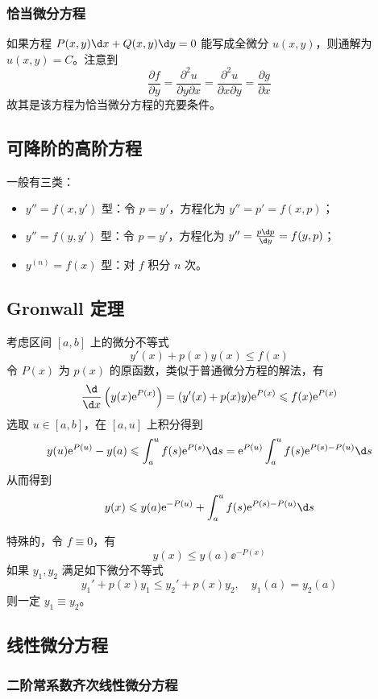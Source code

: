 \subsubsection*{恰当微分方程}

如果方程 $P(x, y) \d x + Q(x, y) \d y = 0$ 能写成全微分 $u(x, y)$，则通解为 $u(x, y) = C$。注意到
\[ \frac{\partial f}{\partial y} = \frac{\partial^2 u}{\partial y \partial x} = \frac{\partial^2 u}{\partial x \partial y} = \frac{\partial g}{\partial x} \]
故其是该方程为恰当微分方程的充要条件。

\subsection{可降阶的高阶方程}

一般有三类：

\begin{itemize}
	\item $y'' = f(x, y')$ 型：令 $p = y'$，方程化为 $y'' = p' = f(x, p)$；
	\item $y'' = f(y, y')$ 型：令 $p = y'$，方程化为 $y'' = \frac{p \d p}{\d y} = f(y, p)$；
	\item $y^{(n)} = f(x)$ 型：对 $f$ 积分 $n$ 次。
\end{itemize}

\subsection{Gronwall 定理}

考虑区间 $[a, b]$ 上的微分不等式
\[ y'(x) + p(x) y(x) \leqslant f(x) \]
令 $P(x)$ 为 $p(x)$ 的原函数，类似于普通微分方程的解法，有
\[ \frac{\d }{\d x} \left(y(x) \ee^{P(x)}\right) = (y'(x) + p(x) y) \ee^{P(x)} \leqslant f(x) \ee^{P(x)} \]
选取 $u \in [a, b]$，在 $[a, u]$ 上积分得到
\[ y(u) \ee^{P(u)} - y(a) \leqslant \int_{a}^{u} f(s) \ee^{P(s)} \d s = \ee^{P(u)} \int_{a}^{u} f(s) \ee^{P(s) - P(u)} \d s  \]
从而得到
\[ y(x) \leqslant y(a) \ee^{-P(u)} + \int_{a}^{u} f(s) \ee^{P(s) - P(u)} \d s \]

特殊的，令 $f \equiv 0$，有
\[ y(x) \leqslant y(a) \ee^{-P(x)} \]
如果 $y_1, y_2$ 满足如下微分不等式
\[ y_1' + p(x) y_1 \leqslant y_2' + p(x) y_2, \quad y_1(a) = y_2(a) \]
则一定 $y_1 \equiv y_2$。

\subsection{线性微分方程}

\subsubsection*{二阶常系数齐次线性微分方程}

